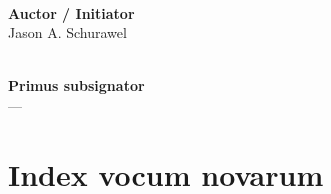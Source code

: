 \documentclass[11pt,a4paper]{article}
\begin{document}
\begin{minipage}{\textwidth}
\vspace{1.1cm} %

\noindent
\begin{minipage}[t]{0.45\textwidth}
  \hrulefill \\[0.4em]
  \textbf{Auctor / Initiator}\\[0.2em]
  {\small Jason A. Schurawel}
\end{minipage}
\hfill
\begin{minipage}[t]{0.45\textwidth}
  \hrulefill \\[0.4em]
  \textbf{Primus subsignator}\\[0.2em]
  {\small ---}
\end{minipage}
\end{minipage}

\newpage
\section*{Index vocum novarum}
\end{document}
